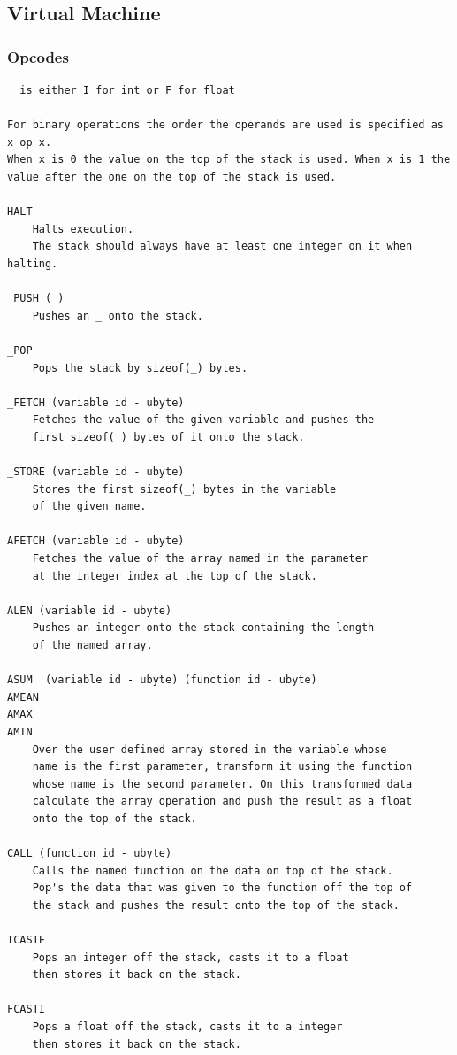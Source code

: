 \subsection{Virtual Machine}

\subsubsection{Opcodes}

\begin{verbatim}
_ is either I for int or F for float

For binary operations the order the operands are used is specified as x op x.
When x is 0 the value on the top of the stack is used. When x is 1 the
value after the one on the top of the stack is used.

HALT
    Halts execution.
    The stack should always have at least one integer on it when halting.

_PUSH (_)
    Pushes an _ onto the stack.

_POP
    Pops the stack by sizeof(_) bytes.

_FETCH (variable id - ubyte)
    Fetches the value of the given variable and pushes the
    first sizeof(_) bytes of it onto the stack.

_STORE (variable id - ubyte)
    Stores the first sizeof(_) bytes in the variable
    of the given name.

AFETCH (variable id - ubyte)
    Fetches the value of the array named in the parameter
    at the integer index at the top of the stack.

ALEN (variable id - ubyte)
    Pushes an integer onto the stack containing the length
    of the named array.
	
ASUM  (variable id - ubyte) (function id - ubyte)
AMEAN
AMAX
AMIN
    Over the user defined array stored in the variable whose
    name is the first parameter, transform it using the function
    whose name is the second parameter. On this transformed data
    calculate the array operation and push the result as a float
    onto the top of the stack.

CALL (function id - ubyte)
    Calls the named function on the data on top of the stack.
    Pop's the data that was given to the function off the top of
    the stack and pushes the result onto the top of the stack.

ICASTF
    Pops an integer off the stack, casts it to a float
    then stores it back on the stack.

FCASTI
    Pops a float off the stack, casts it to a integer
    then stores it back on the stack.


\end{verbatim}
